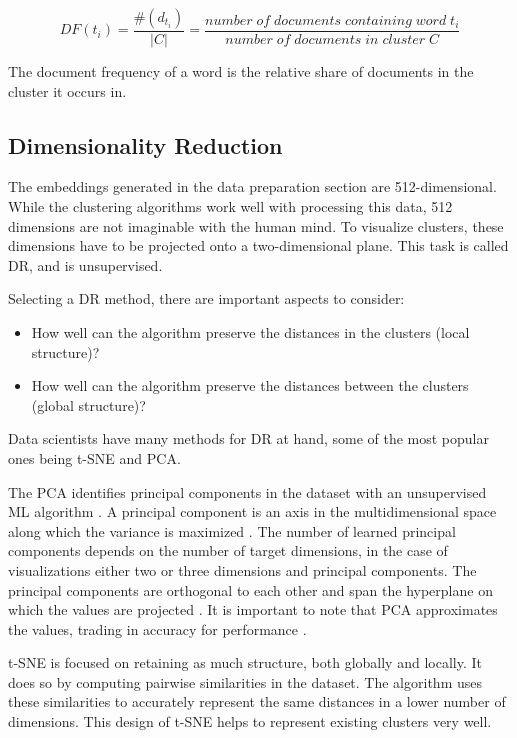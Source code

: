 \[ DF(t_{i}) =\dfrac{\#(d_{t_{i}}) }{|C|} = \dfrac{ number \; of \; documents \; containing \; word \; t_{i}}{number \;  of\;  documents \;  in \; cluster \; C} \]

The document frequency of a word is the relative share of documents in the cluster it occurs in.

\subsection{Dimensionality Reduction}

The embeddings generated in the data preparation section are 512-dimensional. While the clustering algorithms work well with processing this data, 512 dimensions are not imaginable with the human mind. To visualize clusters, these dimensions have to be projected onto a two-dimensional plane. This task is called \ac{DR}, and is unsupervised. 

Selecting a \ac{DR} method, there are important aspects to consider:
\begin{itemize}
	\item How well can the algorithm preserve the distances in the clusters (local structure)?
	\item How well can the algorithm preserve the distances between the clusters (global structure)?
\end{itemize}

Data scientists have many methods for \ac{DR} at hand, some of the most popular ones being \ac{t-SNE} and \ac{PCA}.

The \ac{PCA} identifies principal components in the dataset with an unsupervised \ac{ML} algorithm \cite[ch.~6.3]{40algorithms}. A principal component is an axis in the multidimensional space along which the variance is maximized \cite{pcaVStsne}. The number of learned principal components depends on the number of target dimensions, in the case of visualizations either two or three dimensions and principal components. The principal components are orthogonal to each other and span the hyperplane on which the values are projected \cite{pcaVStsne}.
It is important to note that \ac{PCA} approximates the values, trading in accuracy for performance \cite[ch.~6.3]{40algorithms}.

\ac{t-SNE} is focused on retaining as much structure, both globally and locally. It does so by computing pairwise similarities in the dataset. The algorithm uses these similarities to accurately represent the same distances in a lower number of dimensions. This design of \ac{t-SNE} helps to represent existing clusters very well.

